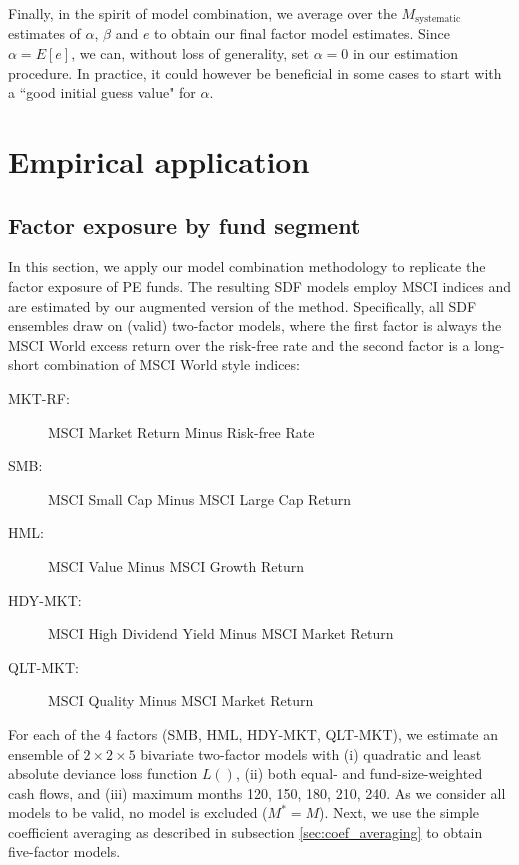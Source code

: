 \documentclass[12pt]{article}
\begin{document}
Finally, in the spirit of model combination, we average over the $M_{\mathrm{systematic}}$ estimates of $\alpha$, $\beta$ and $e$ to obtain our final factor model estimates.
Since $\alpha=E[e]$, we can, without loss of generality, set $\alpha=0$ in our estimation procedure.
In practice, it could however be beneficial in some cases to start with a ``good initial guess value" for $\alpha$.


\section{Empirical application}
\label{sec:applications}

\subsection{Factor exposure by fund segment}
\label{sec:factor_exposure}

In this section, we apply our model combination methodology to replicate the factor exposure of PE funds.
The resulting SDF models employ MSCI indices and are estimated by our augmented version of the \cite{DLP12} method.
Specifically, all SDF ensembles draw on (valid) two-factor models, where the first factor is always the MSCI World excess return over the risk-free rate and the second factor is a long-short combination of MSCI World style indices:
\begin{description}
	\item[MKT-RF:]{MSCI Market Return Minus Risk-free Rate}
	\item[SMB:]{MSCI Small Cap Minus MSCI Large Cap Return}
	\item[HML:]{MSCI Value Minus MSCI Growth Return}
	\item[HDY-MKT:]{MSCI High Dividend Yield Minus MSCI Market Return}
	\item[QLT-MKT:]{MSCI Quality Minus MSCI Market Return}
\end{description}
For each of the 4 factors (SMB, HML, HDY-MKT, QLT-MKT), we estimate an ensemble of $2 \times 2 \times 5$ bivariate two-factor models with (i) quadratic and least absolute deviance loss function $L()$, (ii) both equal- and fund-size-weighted cash flows, and (iii) maximum months 120, 150, 180, 210, 240.
As we consider all models to be valid, no model is excluded ($M^*=M$).
Next, we use the simple coefficient averaging as described in subsection \ref{sec:coef_averaging} to obtain five-factor models.
\end{document}
